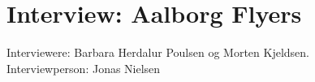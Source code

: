 \chapter{Interview: Aalborg Flyers}\label{ch:appClabel}
Interviewere: Barbara Herdalur Poulsen og Morten Kjeldsen.\\
Interviewperson: Jonas Nielsen\\